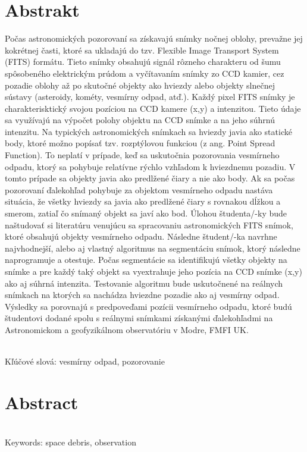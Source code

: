 \documentclass[12pt, a4paper, oneside]{book}
\begin{document}
\chapter*{Abstrakt}\label{chap:abstract_sk}
Počas astronomických pozorovaní sa získavajú snímky nočnej oblohy, prevažne jej kokrétnej časti, ktoré sa ukladajú do tzv. Flexible Image Transport System (FITS) formátu. Tieto snímky obsahujú signál rôzneho charakteru od šumu spôsobeného elektrickým prúdom a vyčítavaním snímky zo CCD kamier, cez pozadie oblohy až po skutočné objekty ako hviezdy alebo objekty slnečnej sústavy (asteroidy, kométy, vesmírny odpad, atď.). Každý pixel FITS snímky je charakterisktický svojou pozíciou na CCD kamere (x,y) a intenzitou. Tieto údaje sa využívajú na výpočet polohy objektu na CCD snímke a na jeho súhrnú intenzitu. Na typických astronomických snímkach sa hviezdy javia ako statické body, ktoré možno popísať tzv. rozptýlovou funkciou (z ang. Point Spread Function). To neplatí v prípade, keď sa uskutočnia pozorovania vesmírneho odpadu, ktorý sa pohybuje relatívne rýchlo vzhľadom k hviezdnemu pozadiu. V tomto prípade sa objekty javia ako predlžené čiary a nie ako body. Ak sa počas pozorovaní ďalekohľad pohybuje za objektom vesmírneho odpadu nastáva situácia, že všetky hviezdy sa javia ako predlžené čiary s rovnakou dĺžkou a smerom, zatiaľ čo snímaný objekt sa javí ako bod. Úlohou študenta/-ky bude naštudovať si literatúru venujúcu sa spracovaniu astronomických FITS snímok, ktoré obsahujú objekty vesmírneho odpadu. Následne študent/-ka navrhne najvhodnejší, alebo aj vlastný algoritmus na segmentáciu snímok, ktorý následne naprogramuje a otestuje. Počas segmentácie sa identifikujú všetky objekty na snímke a pre každý taký objekt sa vyextrahuje jeho pozícia na CCD snímke (x,y) ako aj súhrná intenzita. Testovanie algoritmu bude uskutočnené na reálnych snímkach na ktorých sa nachádza hviezdne pozadie ako aj vesmírny odpad. Výsledky sa porovnajú s predpoveďami pozícii vesmírneho odpadu, ktoré budú študentovi dodané spolu s reálnymi snímkami získanými ďalekohľadmi na Astronomickom a geofyzikálnom observatóriu v Modre, FMFI UK.

~\\
Kľúčové slová: vesmírny odpad, pozorovanie
\vfill\eject 

\chapter*{Abstract}\label{chap:abstract_en}


~\\
Keywords: space debris, observation
\vfill\eject 

\tableofcontents

\mainmatter











\backmatter

\nocite{*}


\end{document}
